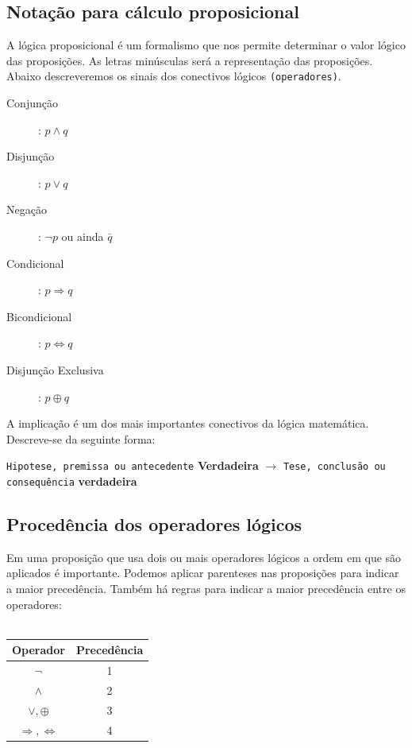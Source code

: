 \documentclass[12pt, onecolumn]{article}
\begin{document}
		\subsection{\centering Notação para cálculo proposicional}

	A lógica proposicional é um formalismo que nos permite determinar o valor 
	lógico das proposições. As letras minúsculas será a representação das 
	proposições. Abaixo descreveremos os sinais dos conectivos lógicos 
	\texttt{(operadores)}.\\
		\begin{description}
			\item[Conjunção]: $p \land q$
			\item[Disjunção]: $p \lor q$
			\item[Negação]: $\lnot p$ ou ainda $\bar{q}$
			\item[Condicional]: $p \Rightarrow q$
			\item[Bicondicional]: $p \Longleftrightarrow q$
			\item[Disjunção Exclusiva]: $p \oplus q$
		\end{description}

	A implicação é um dos mais importantes conectivos da lógica matemática. 
	Descreve-se da seguinte forma: 
	\begin{center}
		\texttt{Hipotese, premissa ou antecedente} \textbf{Verdadeira} 
		$\longrightarrow$
		\texttt{Tese, conclusão ou consequência} \textbf{verdadeira}
	\end{center}
		
	\subsection{\centering Procedência dos operadores lógicos}

	Em uma proposição que usa dois ou mais operadores lógicos a ordem em que são
	aplicados é importante. Podemos aplicar parenteses nas proposições para indicar
	a maior precedência. Também há regras para indicar a maior precedência entre
	os operadores: \\
	\\
		\begin{table}[h]
		\centering
			\begin{tabular}{|c|c|}
				\hline
				Operador & Precedência\\ \hline

				$\lnot$ & 1 \\
				$\land$ & 2 \\
				$\lor, \oplus$ & 3 \\
				$\Rightarrow, \Leftrightarrow$ & 4 \\
				\hline
			\end{tabular}
		\end{table}
\end{document}
